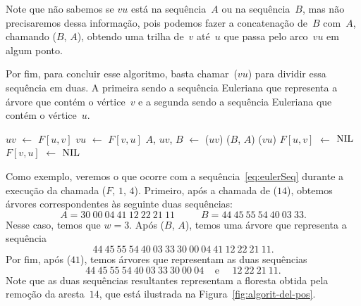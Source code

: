 Note que não sabemos se $vu$ está na sequência~$A$ ou na sequência~$B$, mas não precisaremos dessa informação, pois podemos fazer a concatenação de~$B$ com~$A$,
chamando \treapJoin($B$, $A$), obtendo uma trilha de~$v$ até~$u$ que passa pelo arco~$vu$ em algum ponto.

Por fim, para concluir esse algoritmo, basta chamar~\treapSplit($vu$) para dividir essa sequência em duas.
A primeira sendo a sequência Euleriana que representa a árvore que contém o vértice~$v$ e a segunda sendo a sequência Euleriana que contém o vértice~$u$.

\begin{algorithm}[htb]
\caption{\dymForestDelEdge($F$, $u$, $v$)}
\label{Algo:dymForestDelEdge}
\begin{algorithmic}[1]
\State $uv$ $\gets$ $F[u,v]$\label{Algo:dymForestDelEdge:1}
\State $vu$ $\gets$ $F[v,u]$\label{Algo:dymForestDelEdge:2}
\State $A$, $uv$, $B$ $\gets$ \treapSplit($uv$)\label{Algo:dymForestDelEdge:3}
\State \treapJoin($B$, $A$)\label{Algo:dymForestDelEdge:4}
\State \treapSplit($vu$)\label{Algo:dymForestDelEdge:5}
\State $F[u,v]$ $\gets$ $\text{NIL}{}$\label{Algo:dymForestDelEdge:6}
\State $F[v,u]$ $\gets$ $\text{NIL}{}$\label{Algo:dymForestDelEdge:7}
\end{algorithmic}
\end{algorithm}


Como exemplo, veremos o que ocorre com a sequência~\eqref{eq:eulerSeq} durante a execução da chamada \dymForestDelEdge($F$, $1$, $4$).
Primeiro, após a chamada de \treapSplit($14$), obtemos árvores correspondentes às seguinte duas sequências:
\begin{equation}
A = 30~00~04~41~12~22~21~11~~~~~~~~~~~~B = 44~45~55~54~40~03~33.\nonumber
\end{equation}
Nesse caso, temos que $w=3$. Após \treapJoin($B$, $A$), temos uma árvore que representa a sequência
\begin{equation}
 44~45~55~54~40~03~33~30~00~04~41~12~22~21~11.\nonumber
\end{equation}
Por fim, após \treapSplit($41$), temos árvores que representam as duas sequências
\begin{equation}
 44~45~55~54~40~03~33~30~00~04~~~~~\text{e}~~~~~~12~22~21~11.\label{eq:apos-remocao}
\end{equation}
Note que as duas sequências resultantes representam a floresta obtida pela remoção da aresta~$14$, que está ilustrada na Figura~\ref{fig:algorit-del-pos}.

